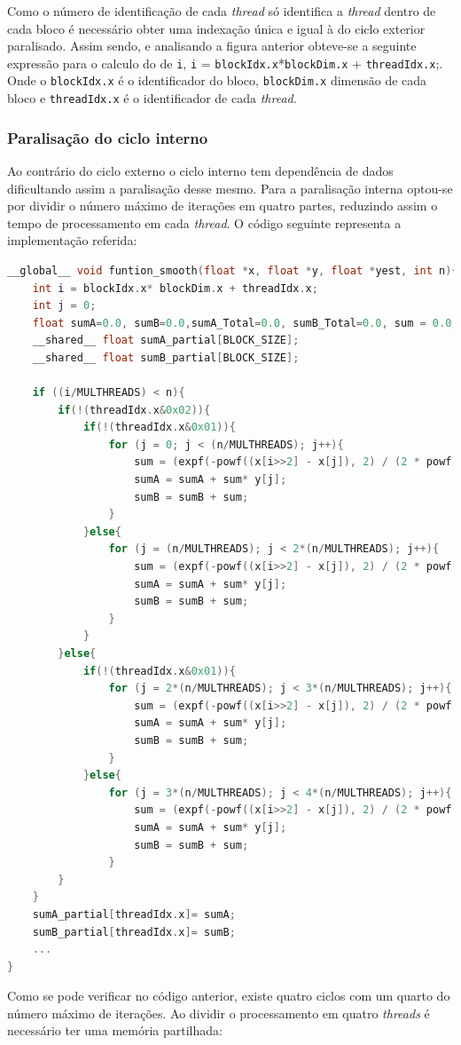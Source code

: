 \documentclass[11pt]{article}
\numberwithin{equation}{section}
\begin{document}
Como o número de identificação de cada \textit{thread} só identifica a \textit{thread} dentro de cada bloco é necessário obter uma indexação única e igual à do ciclo exterior paralisado. Assim sendo, e analisando a figura anterior obteve-se a seguinte expressão para o calculo do de \texttt{i},  \texttt{i} = \texttt{blockIdx.x}*\texttt{blockDim.x} + \texttt{threadIdx.x};. Onde o \texttt{blockIdx.x} é o identificador do bloco, \texttt{blockDim.x} dimensão de cada bloco e \texttt{threadIdx.x} é o identificador de cada \textit{thread}. 
\subsubsection{Paralisação do ciclo interno}
Ao contrário do ciclo externo o ciclo interno tem dependência de dados dificultando assim a paralisação desse mesmo. Para  a paralisação interna optou-se por dividir o número máximo de iterações em quatro partes, reduzindo assim o tempo de processamento em cada \textit{thread}. O código seguinte representa a implementação referida:
 
 \begin{lstlisting}[language=C]
__global__ void funtion_smooth(float *x, float *y, float *yest, int n){
	int i = blockIdx.x* blockDim.x + threadIdx.x;
	int j = 0;
	float sumA=0.0, sumB=0.0,sumA_Total=0.0, sumB_Total=0.0, sum = 0.0; 
	__shared__ float sumA_partial[BLOCK_SIZE];
	__shared__ float sumB_partial[BLOCK_SIZE];
	
	if ((i/MULTHREADS) < n){
		if(!(threadIdx.x&0x02)){
			if(!(threadIdx.x&0x01)){
				for (j = 0; j < (n/MULTHREADS); j++){
					sum = (expf(-powf((x[i>>2] - x[j]), 2) / (2 * powf(SMOOTH, 2))));
					sumA = sumA + sum* y[j];
					sumB = sumB + sum;
				}
			}else{
				for (j = (n/MULTHREADS); j < 2*(n/MULTHREADS); j++){
					sum = (expf(-powf((x[i>>2] - x[j]), 2) / (2 * powf(SMOOTH, 2))));
					sumA = sumA + sum* y[j];
					sumB = sumB + sum;
				}
			}	
		}else{
			if(!(threadIdx.x&0x01)){
				for (j = 2*(n/MULTHREADS); j < 3*(n/MULTHREADS); j++){
					sum = (expf(-powf((x[i>>2] - x[j]), 2) / (2 * powf(SMOOTH, 2))));
					sumA = sumA + sum* y[j];
					sumB = sumB + sum;
				}
			}else{
				for (j = 3*(n/MULTHREADS); j < 4*(n/MULTHREADS); j++){
					sum = (expf(-powf((x[i>>2] - x[j]), 2) / (2 * powf(SMOOTH, 2))));
					sumA = sumA + sum* y[j];
					sumB = sumB + sum;
				}
		}
	}
	sumA_partial[threadIdx.x]= sumA;
	sumB_partial[threadIdx.x]= sumB;
	...
}
 \end{lstlisting}
 
Como se pode verificar no código anterior, existe quatro ciclos com um quarto do número máximo de iterações. Ao dividir o processamento em quatro \textit{threads} é necessário ter uma memória partilhada:
\end{document}
